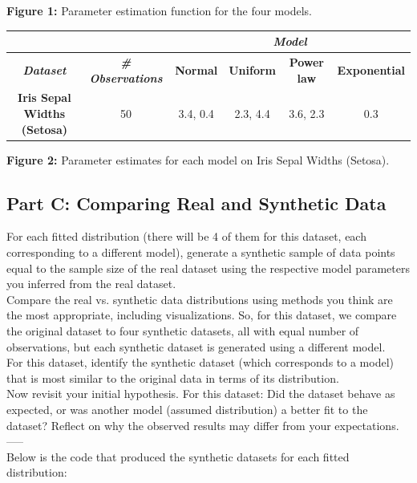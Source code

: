 \begin{center}
\textbf{Figure 1:} Parameter estimation function for the four models.
\end{center}

\begin{center}
\begin{tabular}{|c|c|c|c|c|c|}
\hline
& & \multicolumn{4}{c|}{{\bf{\em{Model}}}}\\
\hline
{{\bf{\em{Dataset}}}} & {\bf{\em{\# Observations}}} &\textbf{Normal}& \textbf{Uniform} & \textbf{Power law} & \textbf{Exponential} \\
\hline
\textbf{Iris Sepal Widths (Setosa)} & 50 &  3.4, 0.4 & 2.3, 4.4 & 3.6, 2.3 & 0.3 \\
\hline
\end{tabular}
\end{center}

\begin{center}
\textbf{Figure 2:} Parameter estimates for each model on Iris Sepal Widths (Setosa).
\end{center}
\newpage


\subsection{Part C: Comparing Real and Synthetic Data}

For each fitted distribution (there will be 4 of them for this dataset, each corresponding to a different model), generate a synthetic sample of data points equal to the sample size of the real dataset using the respective model parameters you inferred from the real dataset.\\

Compare the real vs. synthetic data distributions using methods you think are the most appropriate, including visualizations. So, for this dataset, we compare the original dataset to four synthetic datasets, all with equal number of observations, but each synthetic dataset is generated using a different model.\\

For this dataset, identify the synthetic dataset (which corresponds to a model) that is most similar to the original data in terms of its distribution.\\

Now revisit your initial hypothesis. For this dataset: Did the dataset behave as expected, or was another model (assumed distribution) a better fit to the dataset? Reflect on why the observed results may differ from your expectations.\\ 
-----\\
Below is the code that produced the synthetic datasets for each fitted distribution:

